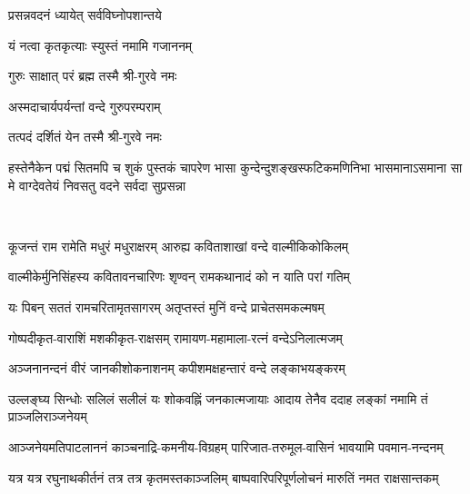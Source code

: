 

{प्रसन्नवदनं ध्यायेत् सर्वविघ्नोपशान्तये}

{यं नत्वा कृतकृत्याः स्युस्तं नमामि गजाननम्}


{गुरुः साक्षात् परं ब्रह्म तस्मै श्री-गुरवे नमः}

{अस्मदाचार्यपर्यन्तां वन्दे गुरुपरम्पराम्}

{तत्पदं दर्शितं येन तस्मै श्री-गुरवे नमः}

{हस्तेनैकेन पद्मं सितमपि च शुकं पुस्तकं चापरेण}
{भासा कुन्देन्दुशङ्खस्फटिकमणिनिभा भासमानाऽसमाना}
{सा मे वाग्देवतेयं निवसतु वदने सर्वदा सुप्रसन्ना}

\mbox{}\\

\twolineshloka
{कूजन्तं राम रामेति मधुरं मधुराक्षरम्}
{आरुह्य कविताशाखां वन्दे वाल्मीकिकोकिलम्}

\twolineshloka
{वाल्मीकेर्मुनिसिंहस्य कवितावनचारिणः}
{शृण्वन् रामकथानादं को न याति परां गतिम्}

\twolineshloka
{यः पिबन् सततं रामचरितामृतसागरम्}
{अतृप्तस्तं मुनिं वन्दे प्राचेतसमकल्मषम्}

\resetShloka
{}

\twolineshloka
{गोष्पदीकृत-वाराशिं मशकीकृत-राक्षसम्}
{रामायण-महामाला-रत्नं वन्देऽनिलात्मजम्}

\twolineshloka
{अञ्जनानन्दनं वीरं जानकीशोकनाशनम्}
{कपीशमक्षहन्तारं वन्दे लङ्काभयङ्करम्}

\twolineshloka
{उल्लङ्घ्य सिन्धोः सलिलं सलीलं यः शोकवह्निं जनकात्मजायाः}
{आदाय तेनैव ददाह लङ्कां नमामि तं प्राञ्जलिराञ्जनेयम्}

\twolineshloka
{आञ्जनेयमतिपाटलाननं काञ्चनाद्रि-कमनीय-विग्रहम्}
{पारिजात-तरुमूल-वासिनं भावयामि पवमान-नन्दनम्}

\twolineshloka
{यत्र यत्र रघुनाथकीर्तनं तत्र तत्र कृतमस्तकाञ्जलिम्}
{बाष्पवारिपरिपूर्णलोचनं मारुतिं नमत राक्षसान्तकम्}

